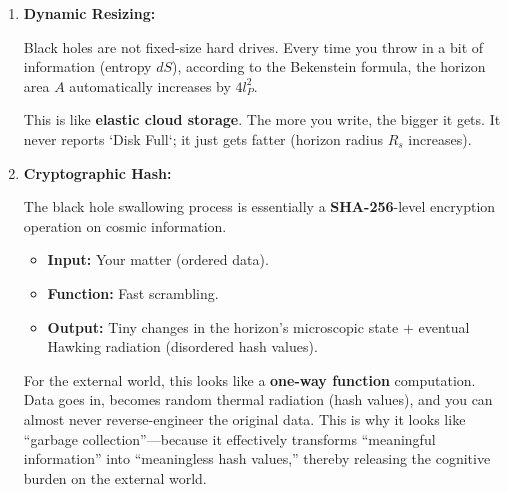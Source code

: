 \begin{enumerate}
\item \textbf{Dynamic Resizing:}

    Black holes are not fixed-size hard drives. Every time you throw in a bit of information (entropy $dS$), according to the Bekenstein formula, the horizon area $A$ automatically increases by $4 l_P^2$.

    This is like \textbf{elastic cloud storage}. The more you write, the bigger it gets. It never reports `Disk Full`; it just gets fatter (horizon radius $R_s$ increases).

\item \textbf{Cryptographic Hash:}

    The black hole swallowing process is essentially a \textbf{SHA-256}-level encryption operation on cosmic information.

    \begin{itemize}
    \item \textbf{Input:} Your matter (ordered data).

    \item \textbf{Function:} Fast scrambling.

    \item \textbf{Output:} Tiny changes in the horizon's microscopic state + eventual Hawking radiation (disordered hash values).
    \end{itemize}

    For the external world, this looks like a \textbf{one-way function} computation. Data goes in, becomes random thermal radiation (hash values), and you can almost never reverse-engineer the original data. This is why it looks like ``garbage collection''---because it effectively transforms ``meaningful information'' into ``meaningless hash values,'' thereby releasing the cognitive burden on the external world.
\end{enumerate}

